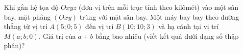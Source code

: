 \begin{ex}
Khi gắn hệ tọa độ $Oxyz$ (đơn vị trên mỗi trục tính theo kilômét) vào một sân bay, mặt phẳng $(Oxy)$ trùng với mặt sân bay. Một máy bay bay theo đường thẳng từ vị trí $A(5;0;5)$ đến vị trí $B(10;10;3)$ và hạ cánh tại vị trí $M(a;b;0)$. Giá trị của $a+b$ bằng bao nhiêu (viết kết quả dưới dạng số thập phân)?
\end{ex}
